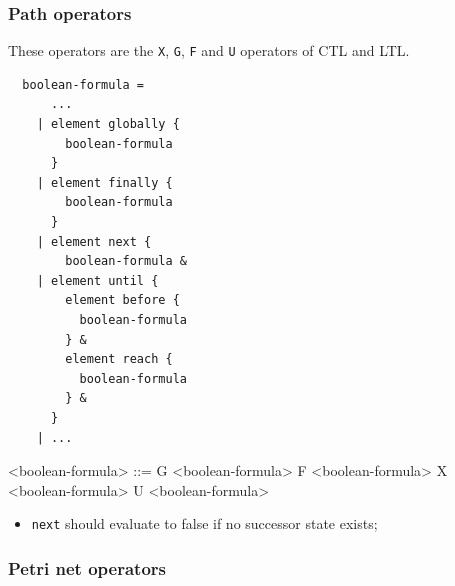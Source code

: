 \documentclass[10pt,english,a4paper]{article}
\begin{document}
\subsubsection{Path operators}

These operators are the \lstinline!X!, \lstinline!G!, \lstinline!F! and \lstinline!U!
operators of CTL and LTL.


\begin{multicols}{2}
\begin{lstlisting}
  boolean-formula =
      ...
    | element globally {
        boolean-formula
      }
    | element finally {
        boolean-formula
      }
    | element next {
        boolean-formula &
    | element until {
        element before {
          boolean-formula
        } &
        element reach {
          boolean-formula
        } &
      }
    | ...
\end{lstlisting}
\columnbreak
\scriptsize
\scriptsize\begin{grammar}
<boolean-formula> ::= G <boolean-formula>
\alt F <boolean-formula>
\alt X <boolean-formula>
 U <boolean-formula>
\end{grammar}
\end{multicols}


\begin{itemize}
  \item \lstinline!next! should evaluate to false if no successor state exists;
\end{itemize}

\subsubsection{Petri net operators}
\end{document}
